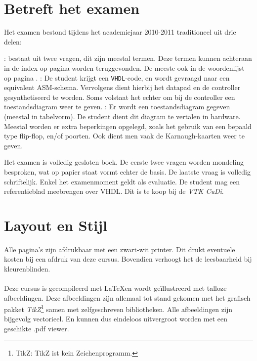 \documentclass[a4paper,10pt,titlepage]{book}
\begin{document}
\begin{it}
\section*{Betreft het examen}
Het examen bestond tijdens het academiejaar 2010-2011 traditioneel uit drie delen:
\begin{enumerate}
 : bestaat uit twee vragen, dit zijn meestal termen. Deze termen kunnen achteraan in de index op pagina \pageref{idx} worden teruggevonden. De meeste ook in de woordenlijst op pagina \pageref{glos}.
 : De student krijgt een \texttt{VHDL}-code, en wordt gevraagd naar een equivalent ASM-schema. Vervolgens dient hierbij het datapad en de controller gesynthetiseerd te worden. Soms volstaat het echter om bij de controller een toestandsdiagram weer te geven.
 : Er wordt een toestandsdiagram gegeven (meestal in tabelvorm). De student dient dit diagram te vertalen in hardware. Meestal worden er extra beperkingen opgelegd, zoals het gebruik van een bepaald type flip-flop, en/of poorten. Ook dient men vaak de Karnaugh-kaarten weer te geven.
\end{enumerate}
Het examen is volledig gesloten boek. De eerste twee vragen worden mondeling besproken, wat op papier staat vormt echter de basis. De laatste vraag is volledig schriftelijk. Enkel het examenmoment geldt als evaluatie. De student mag een referentieblad meebrengen over VHDL. Dit is te koop bij de \emph{VTK CuDi}.
\section*{Layout en Stijl}
\paragraph{}
Alle pagina's zijn afdrukbaar met een zwart-wit printer. Dit drukt eventuele kosten bij een afdruk van deze cursus. Bovendien verhoogt het de leesbaarheid bij kleurenblinden.
\paragraph{}
Deze cursus is gecompileerd met \LaTeX en wordt ge\"illustreerd met talloze afbeeldingen. Deze afbeeldingen zijn allemaal tot stand gekomen met het grafisch pakket \emph{TikZ}\footnote{TikZ: TikZ ist kein Zeichenprogramm.} samen met zelfgeschreven bibliotheken. Alle afbeeldingen zijn bijgevolg vectorieel. En kunnen dus eindeloos uitvergroot worden met een geschikte .pdf viewer.

\end{it}
\end{document}

